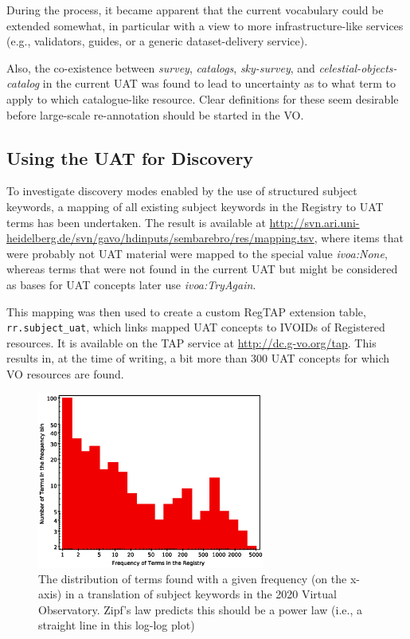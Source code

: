 \documentclass[11pt,a4paper]{ivoa}
\newcommand{\vocterm}[1]{\emph{\color{termcolor}#1}}
\begin{document}
During the process, it became apparent that the current vocabulary could
be extended somewhat, in particular with a view to more
infrastructure-like services (e.g., validators, guides, or a generic
dataset-delivery service).

Also, the co-existence between \vocterm{survey}, \vocterm{catalogs},
\vocterm{sky-survey}, and \vocterm{celestial-objects-catalog} in the
current UAT was found to lead to uncertainty as to what term to apply to
which catalogue-like resource.  Clear definitions for these 
seem desirable before large-scale re-annotation should be started in the
VO.

\subsection{Using the UAT for Discovery}

To investigate discovery modes enabled by the use of structured subject
keywords, a mapping of all existing subject keywords in the Registry to
UAT terms has been undertaken.  The result is available at
\url{http://svn.ari.uni-heidelberg.de/svn/gavo/hdinputs/sembarebro/res/mapping.tsv},
where items that were probably not UAT material were mapped to the
special value \emph{ivoa:None}, whereas terms that were not found in the
current UAT but might be considered as bases for UAT concepts later use
\emph{ivoa:TryAgain}.

This mapping was then used to create a custom RegTAP extension table,
\verb|rr.subject_uat|, which links mapped UAT concepts to IVOIDs of
Registered resources.  It is available on the TAP service at
\url{http://dc.g-vo.org/tap}.  This results in, at the time of writing,
a bit more than 300 UAT concepts for which VO resources are found.

\begin{figure}
\includegraphics[width=7.5cm]{freqfreq.eps}
\caption{The distribution of terms found with a given frequency (on the
x-axis) in a translation of subject keywords in the 2020 Virtual
Observatory.  Zipf's law predicts this should be a power law (i.e., a
straight line in this log-log plot)}
\label{fig:freqfreq}
\end{figure}
\end{document}
